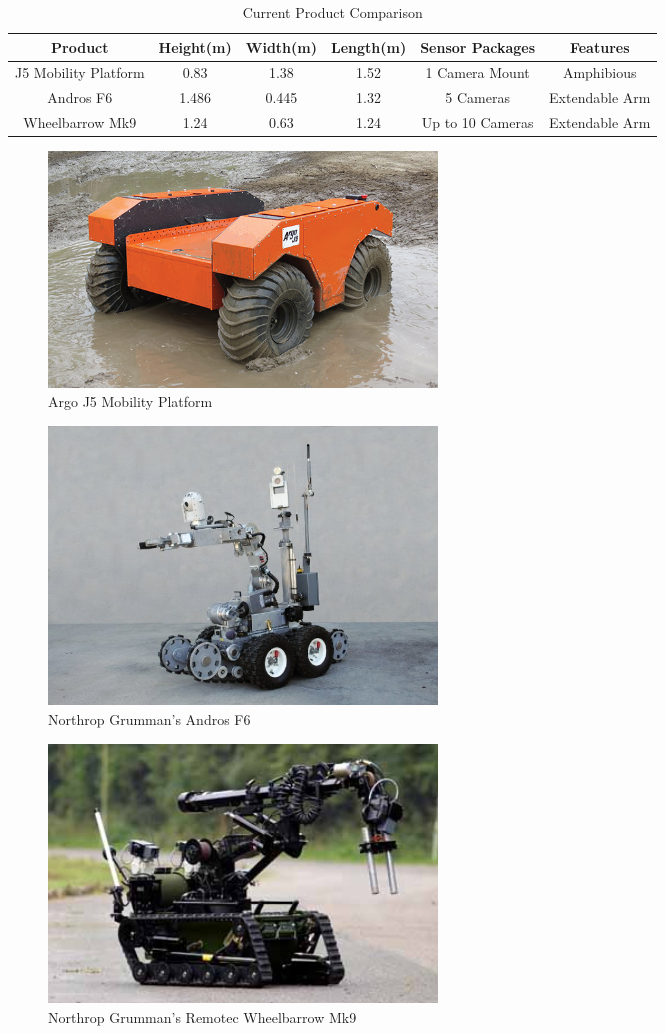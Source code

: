 \begin{table}[H]
\begin{adjustwidth}{-.5in}{-.5in}
\centering
\begin{tabular}{c|c|c|c|c|c}
Product & Height(m) & Width(m) & Length(m) & Sensor Packages & Features\\\hline
J5 Mobility Platform & 0.83 & 1.38 & 1.52 & 1 Camera Mount & Amphibious\\
Andros F6 & 1.486 & 0.445 & 1.32 & 5 Cameras & Extendable Arm \\
Wheelbarrow Mk9 & 1.24 & 0.63 & 1.24 & Up to 10 Cameras & Extendable Arm\\
\end{tabular}
\caption{\label{tab:current} Current Product Comparison}
\end{adjustwidth}
\end{table}

\begin{figure}[H]
\centering
\includegraphics[width=0.5\textwidth]{argo-j5-mobility-platform-2-small-1.jpg}
\caption{Argo J5 Mobility Platform}
\label{fig:ArgoPlatform1}
\end{figure}


\begin{figure}[H]
\centering
\includegraphics[width=0.5\textwidth]{NG1.jpg}
\caption{Northrop Grumman's Andros F6}
\label{fig:NorthropAndros1}
\end{figure}

\begin{figure}[H]
\centering
\includegraphics[width=0.5\textwidth]{wheelbarrow.jpg}
\caption{Northrop Grumman's Remotec Wheelbarrow Mk9}
\label{fig:NorthropWheelbarrow1}
\end{figure}

